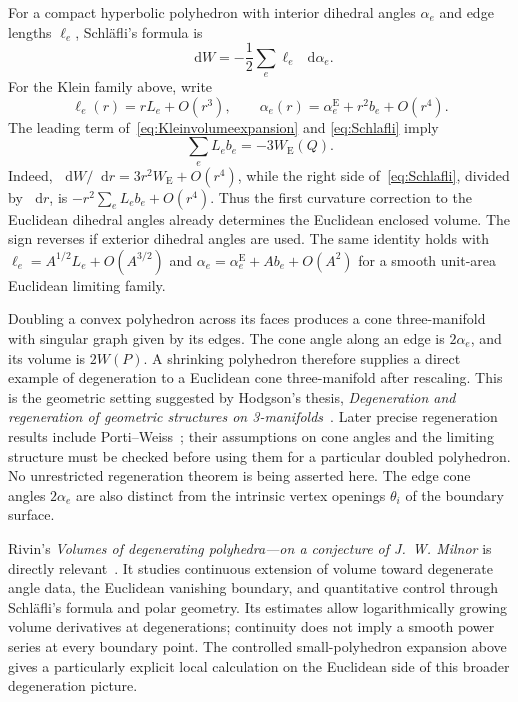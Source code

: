 \documentclass[11pt,a4paper]{article}
\numberwithin{equation}{section}
\theoremstyle{definition}
\theoremstyle{remark}
\newcommand{\dd}{\mathop{}\!\mathrm d}
\begin{document}
For a compact hyperbolic polyhedron with interior dihedral angles
$\alpha_e$ and edge lengths $\ell_e$, Schl\"afli's formula is
\begin{equation}
 \dd W=-\frac12\sum_e\ell_e\,\dd\alpha_e.
 \label{eq:Schlafli}
\end{equation}
For the Klein family above, write
\[
 \ell_e(r)=rL_e+O(r^3),\qquad
 \alpha_e(r)=\alpha_e^{\mathrm E}+r^2b_e+O(r^4).
\]
The leading term of~\eqref{eq:Kleinvolumeexpansion} and
\eqref{eq:Schlafli} imply
\begin{equation}
 \boxed{\quad\sum_eL_e b_e=-3W_{\mathrm E}(Q).\quad}
 \label{eq:firstcurvaturevolume}
\end{equation}
Indeed, $\dd W/\dd r=3r^2W_{\mathrm E}+O(r^4)$, while
the right side of~\eqref{eq:Schlafli}, divided by $\dd r$, is
$-r^2\sum_eL_e b_e+O(r^4)$. Thus the first curvature correction
to the Euclidean dihedral angles already determines the Euclidean
enclosed volume. The sign reverses if exterior dihedral angles are
used. The same identity holds with
$\ell_e=A^{1/2}L_e+O(A^{3/2})$ and
$\alpha_e=\alpha_e^{\mathrm E}+A b_e+O(A^2)$ for a smooth
unit-area Euclidean limiting family.

Doubling a convex polyhedron across its faces produces a cone
three-manifold with singular graph given by its edges. The cone
angle along an edge is $2\alpha_e$, and its volume is $2W(P)$.
A shrinking polyhedron therefore supplies a direct example of
degeneration to a Euclidean cone three-manifold after rescaling.
This is the geometric setting suggested by Hodgson's thesis,
\emph{Degeneration and regeneration of geometric structures on
3-manifolds}~\cite{HodgsonThesis}. Later precise regeneration results
include Porti--Weiss~\cite{PortiWeiss}; their assumptions on cone
angles and the limiting structure must be checked before using
them for a particular doubled polyhedron. No unrestricted
regeneration theorem is being asserted here. The edge cone angles
$2\alpha_e$ are also distinct from the intrinsic vertex openings
$\theta_i$ of the boundary surface.

Rivin's \emph{Volumes of degenerating polyhedra---on a conjecture
of J.~W. Milnor} is directly relevant~\cite{RivinDegeneration}.
It studies continuous extension of volume toward degenerate angle
data, the Euclidean vanishing boundary, and quantitative control
through Schl\"afli's formula and polar geometry. Its estimates
allow logarithmically growing volume derivatives at degenerations;
continuity does not imply a smooth power series at every boundary
point. The controlled small-polyhedron expansion above gives a
particularly explicit local calculation on the Euclidean side of
this broader degeneration picture.
\end{document}
